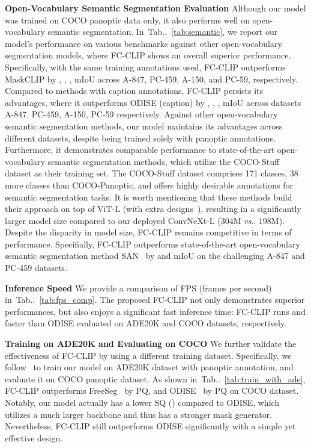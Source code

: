 \documentclass{article}
\makeatletter
\DeclareRobustCommand\onedot{\futurelet\@let@token\@onedot}
\def\@onedot{\ifx\@let@token.\else.\null\fi\xspace}
\def\vs{\emph{vs}\onedot}
\newcommand{\tabref}[1]{Tab\onedot~\ref{#1}}
\newcommand{\modelname}{FC-CLIP\xspace}
\makeatother
\begin{document}
\noindent \textbf{Open-Vocabulary Semantic Segmentation Evaluation}\quad
Although our model was trained on COCO panoptic data only, it also performs well on open-vocabulary semantic segmentation. In~\tabref{tab:semantic}, we report our model's performance on various benchmarks against other open-vocabulary segmentation models, where \modelname shows an overall superior performance. Specifically, with the same training annotations used, \modelname outperforms MaskCLIP by , , ,  mIoU across A-847, PC-459, A-150, and PC-59, respectively. Compared to methods with caption annotations, \modelname persists its advantages, where it outperforms ODISE (caption) by , , ,  mIoU across datasets A-847, PC-459, A-150, PC-59 respectively.
Against other open-vocabulary semantic segmentation methods, our model maintains its advantages across different datasets, despite being trained solely with panoptic annotations. Furthermore, it demonstrates comparable performance to state-of-the-art open-vocabulary semantic segmentation methods, which utilize the COCO-Stuff dataset as their training set. The COCO-Stuff dataset comprises 171 classes, 38 more classes than COCO-Panoptic, and offers highly desirable annotations for semantic segmentation tasks. It is worth mentioning that these methods build their approach on top of ViT-L (with extra designs~\cite{xu2023side}), resulting in a significantly larger model size compared to our deployed ConvNeXt-L (304M \vs 198M). Despite the disparity in model size, \modelname remains competitive in terms of performance. Specifially, \modelname outperforms state-of-the-art open-vocabulary semantic segmentation method SAN~\cite{xu2023side} by  and  mIoU on the challenging A-847 and PC-459 datasets. 

\noindent \textbf{Inference Speed}\quad
We provide a comparison of FPS (frames per second) in~\tabref{tab:fps_comp}. The proposed \modelname not only demonstrates superior performances, but also enjoys a significant fast inference time: \modelname runs  and  faster than ODISE evaluated on ADE20K and COCO datasets, respectively.


\noindent \textbf{Training on ADE20K and Evaluating on COCO}\quad
We further validate the effectiveness of \modelname by using a different training dataset.
Specifically, we follow~\cite{qin2023freeseg,xu2023open} to train our model on ADE20K dataset with panoptic annotation, and evaluate it on COCO panoptic dataset. As shown  in~\tabref{tab:train_with_ade},
\modelname outperforms FreeSeg~\cite{qin2023freeseg} by  PQ, and ODISE~\cite{xu2023open} by  PQ on COCO dataset.
Notably, our model actually has a lower SQ () compared to ODISE, which utilizes a much larger backbone and thus has a stronger mask generator.
Nevertheless, \modelname still outperforms ODISE significantly with a simple yet effective design.
\end{document}

